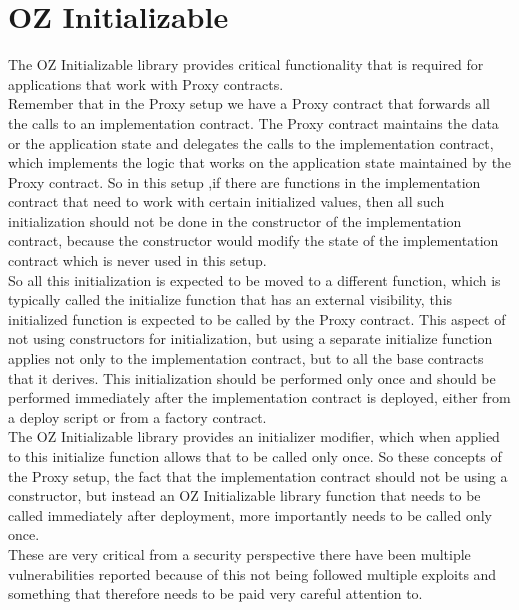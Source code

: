 \section{OZ Initializable}

The OZ Initializable library provides critical functionality that is required for applications that work with Proxy contracts.\\

Remember that in the Proxy setup we have a Proxy contract that forwards all the calls to an implementation contract. The Proxy contract maintains the data or the application state and delegates the calls to the implementation contract, which implements the logic that works on the application state maintained by the Proxy contract. So in this setup ,if there are functions in the implementation contract that need to work with certain initialized values, then all such initialization should not be done in the constructor of the implementation contract, because the constructor would modify the state of the implementation contract which is never used in this setup.\\

So all this initialization is expected to be moved to a different function, which is typically called the initialize function that has an external visibility, this initialized function is expected to be called by the Proxy contract. This aspect of not using constructors for initialization, but using a separate initialize function applies not only to the implementation contract, but to all the base contracts that it derives. This initialization should be performed only once and should be performed immediately after the implementation contract is deployed, either from a deploy script or from a factory contract.\\ 

The OZ Initializable library provides an initializer modifier, which when applied to this initialize function allows that to be called only once. So these concepts of the Proxy setup, the fact that the implementation contract should not be using a constructor, but instead an OZ Initializable library function that needs to be called immediately after deployment, more importantly needs to be called only once.\\

These are very critical from a security perspective there have been multiple vulnerabilities reported because of this not being followed multiple exploits and something that therefore needs to be paid very careful attention to.

